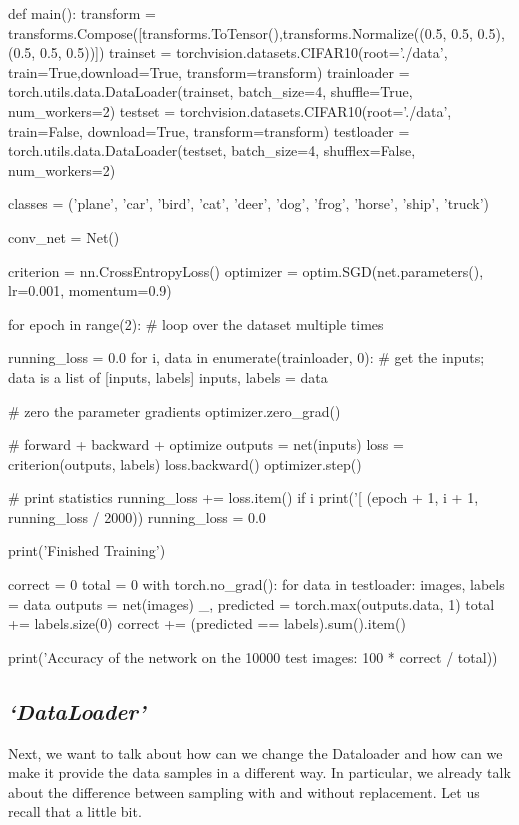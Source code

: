\begin{python}
def main():
	transform = transforms.Compose([transforms.ToTensor(),transforms.Normalize((0.5, 0.5, 0.5), (0.5, 0.5, 0.5))])
	trainset = torchvision.datasets.CIFAR10(root='./data', train=True,download=True, transform=transform)
	trainloader = torch.utils.data.DataLoader(trainset, batch_size=4, shuffle=True, num_workers=2)
	testset = torchvision.datasets.CIFAR10(root='./data', train=False, download=True, transform=transform)
	testloader = torch.utils.data.DataLoader(testset, batch_size=4, shufflex=False, num_workers=2)

classes = ('plane', 'car', 'bird', 'cat',
           'deer', 'dog', 'frog', 'horse', 'ship', 'truck')
           
conv_net = Net()

criterion = nn.CrossEntropyLoss()
optimizer = optim.SGD(net.parameters(), lr=0.001, momentum=0.9)
 
for epoch in range(2):  # loop over the dataset multiple times

    running_loss = 0.0
    for i, data in enumerate(trainloader, 0):
        # get the inputs; data is a list of [inputs, labels]
        inputs, labels = data

        # zero the parameter gradients
        optimizer.zero_grad()

        # forward + backward + optimize
        outputs = net(inputs)
        loss = criterion(outputs, labels)
        loss.backward()
        optimizer.step()

        # print statistics
        running_loss += loss.item()
        if i %
            print('[%
                  (epoch + 1, i + 1, running_loss / 2000))
            running_loss = 0.0

print('Finished Training')

correct = 0
total = 0
with torch.no_grad():
    for data in testloader:
        images, labels = data
        outputs = net(images)
        _, predicted = torch.max(outputs.data, 1)
        total += labels.size(0)
        correct += (predicted == labels).sum().item()

print('Accuracy of the network on the 10000 test images: %
    100 * correct / total))

\end{python}

\subsection{\emph{`DataLoader'}}
Next, we want to talk about how can we change the Dataloader and how can we make it provide the data samples in a different way. In particular, we already talk about the difference between sampling with and without replacement. Let us recall that a little bit.


